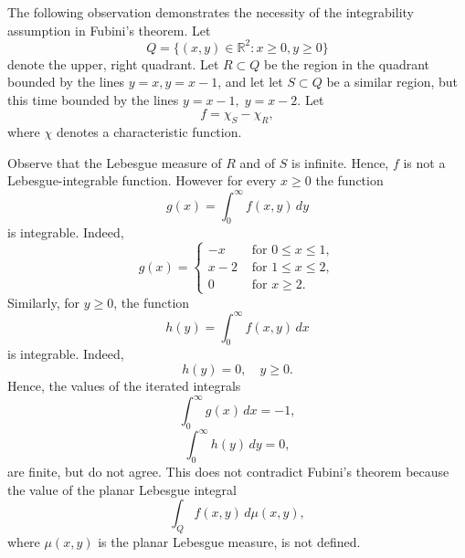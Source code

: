 \documentclass[12pt]{article}
\begin{document}
The following observation demonstrates the necessity of the
integrability assumption in Fubini's theorem.  Let \[Q= \{ (x,y)\in
\mathbb{R}^2: x\geq0, y\geq 0\}\] denote the upper, right quadrant.
Let $R\subset Q$ be the region in the quadrant bounded by the lines
$y=x, y=x-1$, and let let $S\subset Q$ be a similar region, but this
time bounded by the lines $y=x-1,\; y=x-2$.  Let \[f = \chi_{S}-
\chi_R,\] where $\chi$ denotes a characteristic function.

Observe that the Lebesgue measure of $R$ and of $S$ is infinite.
Hence, $f$ is not a Lebesgue-integrable function.  However for every
$x\geq 0$ the function
\[ g(x) = \int_0^\infty f(x,y)\, dy \]
is integrable.
Indeed,
\[ g(x) = \left\{
  \begin{array}{cl}
    -x & \mbox{ for } 0 \leq x \leq 1,\\
    x-2 & \mbox{ for } 1\leq x \leq 2,\\
    0 & \mbox{ for } x\geq 2.
  \end{array} \right.
\]
Similarly, for $y\geq 0$, the function
\[ h(y) = \int_0^\infty f(x,y)\, dx\]
is integrable.  Indeed, 
\[ h(y) = 0,\quad y\geq 0.\]
Hence, the values of the iterated integrals  
$$ \int_0^\infty g(x) \, dx =   -1,$$
$$ \int_0^\infty h(y)\, dy =  0,$$
are finite, but do not agree.  This does not contradict Fubini's
theorem because the value of the planar Lebesgue integral 
\[ \int_Q f(x,y)\, d\mu(x,y), \]
where $\mu(x,y)$ is the planar Lebesgue measure, is not defined.
\end{document}

